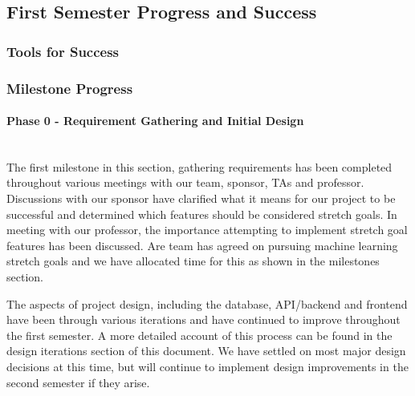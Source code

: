 \subsection{First Semester Progress and Success}
\subsubsection{Tools for Success}
\subsubsection{Milestone Progress}
\paragraph{Phase 0 - Requirement Gathering and Initial Design} \mbox{}\\[\paragraphheaderspace]
The first milestone in this section, gathering requirements has been completed throughout various meetings with our team, sponsor, TAs and professor. Discussions with our sponsor have clarified what it means for our project to be successful and determined which features should be considered stretch goals. In meeting with our professor, the importance attempting to implement stretch goal features has been discussed. Are team has agreed on pursuing machine learning stretch goals and we have allocated time for this as shown in the milestones section.\par
The aspects of project design, including the database, API/backend and frontend have been through various iterations and have continued to improve throughout the first semester. A more detailed account of this process can be found in the design iterations section of this document. We have settled on most major design decisions at this time, but will continue to implement design improvements in the second semester if they arise.\par